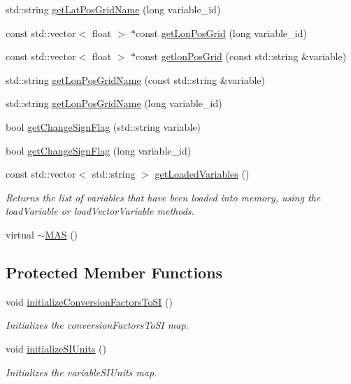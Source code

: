 \begin{DoxyCompactItemize}
std\-::string \hyperlink{classccmc_1_1_m_a_s_a2001608a37a8dfc35b4981d0397be7f0}{get\-Lat\-Pos\-Grid\-Name} (long variable\-\_\-id)
\item 
const std\-::vector$<$ float $>$ $\ast$const \hyperlink{classccmc_1_1_m_a_s_a1162c5d869616eb5085525a520897dfe}{get\-Lon\-Pos\-Grid} (long variable\-\_\-id)
\item 
const std\-::vector$<$ float $>$ $\ast$const \hyperlink{classccmc_1_1_m_a_s_aa463b73b90175dd3a4067807a5794613}{getlon\-Pos\-Grid} (const std\-::string \&variable)
\item 
std\-::string \hyperlink{classccmc_1_1_m_a_s_a00aa9361fb3997403ca55311f95689d2}{get\-Lon\-Pos\-Grid\-Name} (const std\-::string \&variable)
\item 
std\-::string \hyperlink{classccmc_1_1_m_a_s_aeaba6800251f922352e98865deba9a23}{get\-Lon\-Pos\-Grid\-Name} (long variable\-\_\-id)
\item 
bool \hyperlink{classccmc_1_1_m_a_s_a33a19b98d4e265ecbdb8eb1f0870017b}{get\-Change\-Sign\-Flag} (std\-::string variable)
\item 
bool \hyperlink{classccmc_1_1_m_a_s_a39e6ce2453ed357f6233a45ee470a02f}{get\-Change\-Sign\-Flag} (long variable\-\_\-id)
\item 
const std\-::vector$<$ std\-::string $>$ \hyperlink{classccmc_1_1_m_a_s_afee47f580c257809729f39f77f26229b}{get\-Loaded\-Variables} ()
\begin{DoxyCompactList}\small\item\em Returns the list of variables that have been loaded into memory, using the load\-Variable or load\-Vector\-Variable methods. \end{DoxyCompactList}\item 
virtual \hyperlink{classccmc_1_1_m_a_s_a92b3216af9c4e6d456d1826ed0b17801}{$\sim$\-M\-A\-S} ()
\end{DoxyCompactItemize}
\subsection*{Protected Member Functions}
\begin{DoxyCompactItemize}
\item 
void \hyperlink{classccmc_1_1_m_a_s_abb1b32fcba0ca5bc7eabae7d2042e3ce}{initialize\-Conversion\-Factors\-To\-S\-I} ()
\begin{DoxyCompactList}\small\item\em Initializes the conversion\-Factors\-To\-S\-I map.  \end{DoxyCompactList}\item 
void \hyperlink{classccmc_1_1_m_a_s_a9b6c97641c9cdcacc71e706c82f0ef3d}{initialize\-S\-I\-Units} ()
\begin{DoxyCompactList}\small\item\em Initializes the variable\-S\-I\-Units map.  \end{DoxyCompactList}\end{DoxyCompactItemize}
